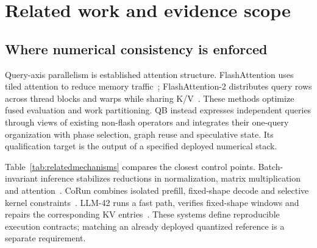 \section{Related work and evidence scope}
\label{sec:related}
\subsection{Where numerical consistency is enforced}
Query-axis parallelism is established attention structure. FlashAttention uses tiled attention to reduce memory traffic~\cite{flashattention}; FlashAttention-2 distributes query rows across thread blocks and warps while sharing K/V~\cite{flashattention2}. These methods optimize fused evaluation and work partitioning. QB instead expresses independent queries through views of existing non-flash operators and integrates their one-query organization with phase selection, graph reuse and speculative state. Its qualification target is the output of a specified deployed numerical stack.

Table~\ref{tab:relatedmechanisms} compares the closest control points. Batch-invariant inference stabilizes reductions in normalization, matrix multiplication and attention~\cite{thinkingmachines}. CoRun combines isolated prefill, fixed-shape decode and selective kernel constraints~\cite{corun}. LLM-42 runs a fast path, verifies fixed-shape windows and repairs the corresponding KV entries~\cite{llm42}. These systems define reproducible execution contracts; matching an already deployed quantized reference is a separate requirement.

